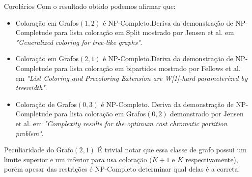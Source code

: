 \documentclass[9pt, compress]{beamer}
\begin{document}
    \begin{frame}{Corolários}
      Com o resultado obtido podemos afirmar que:
      \begin{itemize}
        \item Coloração em Grafos$(1,2)$ é NP-Completo.\newline Deriva da demonstração de NP-Completude para lista coloração em Split mostrado por Jensen et al. em \textit{"Generalized coloring for tree-like graphs"}.
        \item Coloração em Grafos$(2,1)$ é NP-Completo.\newline Deriva da demonstração de NP-Completude para lista coloração em bipartidos mostrado por Fellows et al. em \textit{"List Coloring and Precoloring Extension are W[1]-hard parameterized by treewidth"}.
        \item Coloração de Grafos$(0,3)$ é NP-Completo.
        \newline Deriva da demonstração de NP-Completude para lista coloração em Grafos$(0,2)$ demonstrado por Jensen et al. em \textit{"Complexity results for the optimum cost chromatic partition problem"}.
      \end{itemize}
    \end{frame}
    \begin{frame}{ Peculiaridade do Grafo$(2,1)$ }
      É trivial notar que essa classe de grafo possui um limite superior e um inferior para usa coloração ($K+1$ e $K$ respectivamente), porém apesar das restrições é NP-Completo determinar qual delas é a correta.
    \end{frame}
\end{document}
